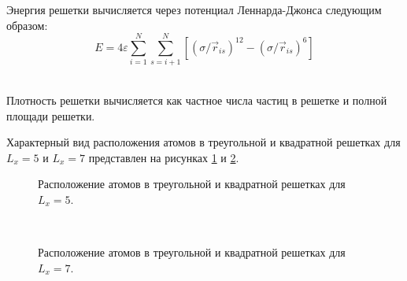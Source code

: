 \documentclass[14pt,a4paper,report]{ncc}
\begin{document}
Энергия решетки вычисляется через потенциал Леннарда-Джонса следующим образом:
\begin{equation}
E=4 \varepsilon \sum\limits_{i=1}^N \sum\limits_{s=i+1}^N{ [(\sigma/\vec{r}_{is})^{12} - (\sigma/\vec{r}_{is})^{6}  ]}
\end{equation}
\

Плотность решетки вычисляется как частное числа частиц в решетке и полной площади решетки.

Характерный вид расположения атомов в треугольной и квадратной решетках для $L_x=5$ и $L_x=7$ представлен на рисунках \ref{ris:image1} и \ref{ris:image2}. 
\begin{figure}[h]
\caption{Расположение атомов в треугольной и квадратной решетках для $L_x=5$.}
\label{ris:image1}
\end{figure}
\

\begin{figure}[h]
\caption{Расположение атомов в треугольной и квадратной решетках для $L_x=7$.}
\label{ris:image2}
\end{figure}
\
\end{document}
